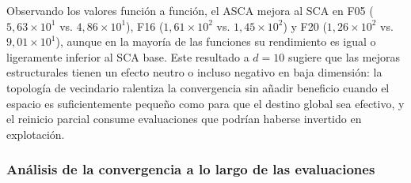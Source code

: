 \documentclass[12pt,a4paper]{article}
\begin{document}
Observando los valores función a función, el ASCA mejora al SCA en F05 ($5{,}63 \times 10^1$ vs. $4{,}86 \times 10^1$), F16 ($1{,}61 \times 10^2$ vs. $1{,}45 \times 10^2$) y F20 ($1{,}26 \times 10^2$ vs. $9{,}01 \times 10^1$), aunque en la mayoría de las funciones su rendimiento es igual o ligeramente inferior al SCA base. Este resultado a $d=10$ sugiere que las mejoras estructurales tienen un efecto neutro o incluso negativo en baja dimensión: la topología de vecindario ralentiza la convergencia sin añadir beneficio cuando el espacio es suficientemente pequeño como para que el destino global sea efectivo, y el reinicio parcial consume evaluaciones que podrían haberse invertido en explotación.

\subsubsection{Análisis de la convergencia a lo largo de las evaluaciones}
\end{document}
